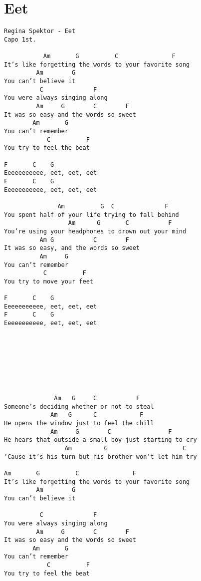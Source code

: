 \documentclass[leqno]{memoir}
\begin{document}
\chapter{Eet}
\begin{verbatim}
Regina Spektor - Eet
Capo 1st.

           Am       G          C               F
It’s like forgetting the words to your favorite song 
         Am        G
You can’t believe it 
          C              F
You were always singing along 
         Am     G        C        F 
It was so easy and the words so sweet 
        Am       G
You can’t remember 
            C          F
You try to feel the beat  

F       C    G
Eeeeeeeeeee, eet, eet, eet 
F       C    G
Eeeeeeeeeee, eet, eet, eet 

               Am          G  C              F
You spent half of your life trying to fall behind 
                  Am      G       C           F
You’re using your headphones to drown out your mind 
          Am G           C        F
It was so easy, and the words so sweet 
          Am     G
You can’t remember 
           C          F
You try to move your feet 

F       C    G
Eeeeeeeeeee, eet, eet, eet 
F       C    G
Eeeeeeeeeee, eet, eet, eet 








              Am   G     C           F
Someone’s deciding whether or not to steal 
             Am   G      C            F
He opens the window just to feel the chill 
             Am     G        C                F
He hears that outside a small boy just starting to cry 
                 Am         G                     C
‘Cause it’s his turn but his brother won’t let him try  

Am       G          C               F
It’s like forgetting the words to your favorite song 
         Am        G
You can’t believe it 

          C              F
You were always singing along 
         Am     G        C        F 
It was so easy and the words so sweet 
        Am       G
You can’t remember 
            C          F
You try to feel the beat  

\end{verbatim}
\newpage
\end{document}

